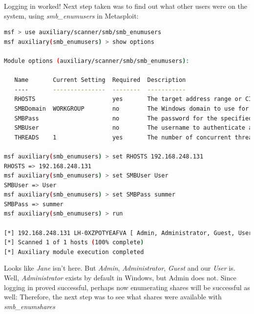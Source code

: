 Logging in worked! Next step taken was to find out what other users were on the system, using \textit{smb\_enumusers} in Metasploit:

\begin{lstlisting}[language=bash,caption={Enumerating users}]
msf > use auxiliary/scanner/smb/smb_enumusers
msf auxiliary(smb_enumusers) > show options

Module options (auxiliary/scanner/smb/smb_enumusers):

   Name       Current Setting  Required  Description
   ----       ---------------  --------  -----------
   RHOSTS                      yes       The target address range or CIDR identifier
   SMBDomain  WORKGROUP        no        The Windows domain to use for authentication
   SMBPass                     no        The password for the specified username
   SMBUser                     no        The username to authenticate as
   THREADS    1                yes       The number of concurrent threads

msf auxiliary(smb_enumusers) > set RHOSTS 192.168.248.131
RHOSTS => 192.168.248.131
msf auxiliary(smb_enumusers) > set SMBUser User
SMBUser => User
msf auxiliary(smb_enumusers) > set SMBPass summer
SMBPass => summer
msf auxiliary(smb_enumusers) > run

[*] 192.168.248.131 LH-0XZPOTYEAFVA [ Admin, Administrator, Guest, User ] ( LockoutTries=0 PasswordMin=0 )
[*] Scanned 1 of 1 hosts (100% complete)
[*] Auxiliary module execution completed
\end{lstlisting}

Looks like \textit{Jane} isn't here. But \textit{Admin}, \textit{Administrator}, \textit{Guest} and our \textit{User} is. Well, \textit{Administrator} exists by default in Windows, but Admin does not. Since logging in proved successful, perhaps now enumerating shares will be successful as well: Therefore, the next step was to see what shares were available with \textit{smb\_enumshares}

